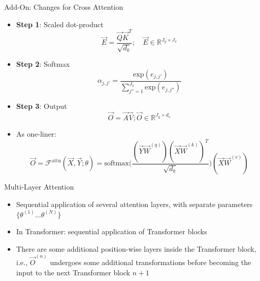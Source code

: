 \documentclass[11pt,compress,t,notes=noshow, xcolor=table]{beamer}
\begin{document}

\begin{vbframe}{Add-On: Changes for Cross Attention}

\vfill

\begin{itemize}
	  \item \textbf{Step 1}: Scaled dot-product $$\vec {E} = \frac{ \vec {Q} \vec {K}^T}{\sqrt{d_k}}; \quad \vec E \in \mathbb{R}^{J_y \times J_x}$$
	  \item \textbf{Step 2}: Softmax $$\alpha_{j,j'} = \frac{\mathrm{exp}(e_{j,j'})}{\sum_{j''=1}^{J_x} \mathrm{exp}(e_{j,j''})}$$
		\item \textbf{Step 3}: Output $$\vec {O} = \vec {A} \vec {V}; \vec O \in \mathbb{R}^{J_y \times d_v}$$
		\item As one-liner: $$ \vec O = \mathcal{F}^\mathrm{attn}(\vec X, \vec Y; \theta) = \mathrm{softmax}\Big(\frac{(\vec Y\vec W^{(q)} ) (\vec X\vec W^{(k)} )^T}{\sqrt{d_k}}\Big)(\vec X\vec W^{(v)} ) $$
\end{itemize}

\vfill

\end{vbframe}


\begin{vbframe}{Multi-Layer Attention}

\vfill

\begin{itemize}
\item Sequential application of several attention layers, with separate parameters $\{\theta^{(1)} \ldots \theta^{(N)}\}$ 
\item In Transformer: sequential application of Transformer blocks
\item There are some additional position-wise layers inside the Transformer block, i.e., $\vec O^{(n)}$ undergoes some additional transformations before becoming the input to the next Transformer block $n+1$
\end{itemize}

\vfill

\end{vbframe}

\end{document}
